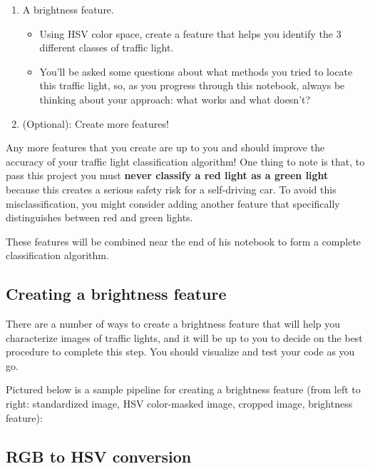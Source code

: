 \documentclass[11pt]{article}
\providecommand{\tightlist}{%
      \setlength{\itemsep}{0pt}\setlength{\parskip}{0pt}}
\begin{document}
\begin{enumerate}
\def\labelenumi{\arabic{enumi}.}
\tightlist
\item
  A brightness feature.

  \begin{itemize}
  \tightlist
  \item
    Using HSV color space, create a feature that helps you identify the
    3 different classes of traffic light.
  \item
    You'll be asked some questions about what methods you tried to
    locate this traffic light, so, as you progress through this
    notebook, always be thinking about your approach: what works and
    what doesn't?
  \end{itemize}
\item
  (Optional): Create more features!
\end{enumerate}

Any more features that you create are up to you and should improve the
accuracy of your traffic light classification algorithm! One thing to
note is that, to pass this project you must \textbf{never classify a red
light as a green light} because this creates a serious safety risk for a
self-driving car. To avoid this misclassification, you might consider
adding another feature that specifically distinguishes between red and
green lights.

These features will be combined near the end of his notebook to form a
complete classification algorithm.

    \hypertarget{creating-a-brightness-feature}{%
\subsection{Creating a brightness
feature}\label{creating-a-brightness-feature}}

There are a number of ways to create a brightness feature that will help
you characterize images of traffic lights, and it will be up to you to
decide on the best procedure to complete this step. You should visualize
and test your code as you go.

Pictured below is a sample pipeline for creating a brightness feature
(from left to right: standardized image, HSV color-masked image, cropped
image, brightness feature):

    \hypertarget{rgb-to-hsv-conversion}{%
\subsection{RGB to HSV conversion}\label{rgb-to-hsv-conversion}}
\end{document}
